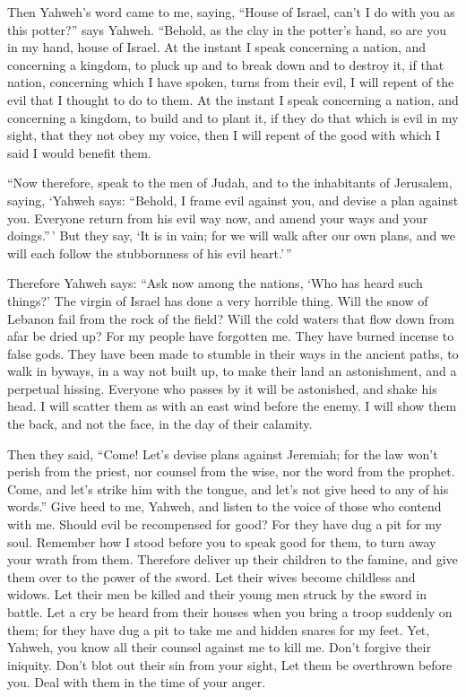  Then Yahweh's word came to me, saying,  ``House
of Israel, can't I do with you as this potter?'' says Yahweh. ``Behold,
as the clay in the potter's hand, so are you in my hand, house of
Israel.  At the instant I speak concerning a nation, and
concerning a kingdom, to pluck up and to break down and to destroy it,
 if that nation, concerning which I have spoken, turns from
their evil, I will repent of the evil that I thought to do to them.
 At the instant I speak concerning a nation, and concerning
a kingdom, to build and to plant it,  if they do that which
is evil in my sight, that they not obey my voice, then I will repent of
the good with which I said I would benefit them.

 ``Now therefore, speak to the men of Judah, and to the
inhabitants of Jerusalem, saying, `Yahweh says: ``Behold, I frame evil
against you, and devise a plan against you. Everyone return from his
evil way now, and amend your ways and your doings.''\,' 
But they say, `It is in vain; for we will walk after our own plans, and
we will each follow the stubbornness of his evil heart.'\,''

 Therefore Yahweh says: ``Ask now among the nations, `Who
has heard such things?' The virgin of Israel has done a very horrible
thing.  Will the snow of Lebanon fail from the rock of the
field? Will the cold waters that flow down from afar be dried up?
 For my people have forgotten me. They have burned incense
to false gods. They have been made to stumble in their ways in the
ancient paths, to walk in byways, in a way not built up, 
to make their land an astonishment, and a perpetual hissing. Everyone
who passes by it will be astonished, and shake his head.  I
will scatter them as with an east wind before the enemy. I will show
them the back, and not the face, in the day of their calamity.

 Then they said, ``Come! Let's devise plans against
Jeremiah; for the law won't perish from the priest, nor counsel from the
wise, nor the word from the prophet. Come, and let's strike him with the
tongue, and let's not give heed to any of his words.'' 
Give heed to me, Yahweh, and listen to the voice of those who contend
with me.  Should evil be recompensed for good? For they
have dug a pit for my soul. Remember how I stood before you to speak
good for them, to turn away your wrath from them. 
Therefore deliver up their children to the famine, and give them over to
the power of the sword. Let their wives become childless and widows. Let
their men be killed and their young men struck by the sword in battle.
 Let a cry be heard from their houses when you bring a
troop suddenly on them; for they have dug a pit to take me and hidden
snares for my feet.  Yet, Yahweh, you know all their
counsel against me to kill me. Don't forgive their iniquity. Don't blot
out their sin from your sight, Let them be overthrown before you. Deal
with them in the time of your anger.


